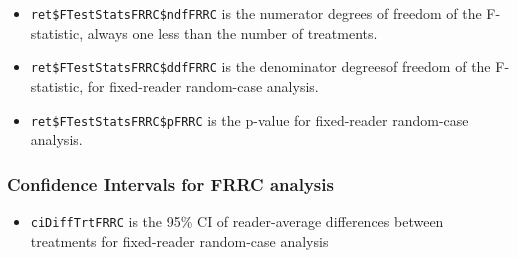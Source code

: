 \documentclass[
]{book}
\newenvironment{Shaded}{\begin{snugshade}}{\end{snugshade}}
\newcommand{\CommentTok}[1]{\textcolor[rgb]{0.56,0.35,0.01}{\textit{#1}}}
\newcommand{\NormalTok}[1]{#1}
\newcommand{\OperatorTok}[1]{\textcolor[rgb]{0.81,0.36,0.00}{\textbf{#1}}}
\providecommand{\tightlist}{%
  \setlength{\itemsep}{0pt}\setlength{\parskip}{0pt}}
\begin{document}
\begin{itemize}
\tightlist
\item
  \texttt{ret\$FTestStatsFRRC\$ndfFRRC} is the numerator degrees of freedom of the F-statistic, always one less than the number of treatments.
\end{itemize}

\begin{Shaded}
\end{Shaded}

\begin{itemize}
\tightlist
\item
  \texttt{ret\$FTestStatsFRRC\$ddfFRRC} is the denominator degreesof freedom of the F-statistic, for fixed-reader random-case analysis.
\end{itemize}

\begin{Shaded}
\end{Shaded}

\begin{itemize}
\tightlist
\item
  \texttt{ret\$FTestStatsFRRC\$pFRRC} is the p-value for fixed-reader random-case analysis.
\end{itemize}

\begin{Shaded}
\end{Shaded}

\hypertarget{confidence-intervals-for-frrc-analysis}{%
\subsubsection{Confidence Intervals for FRRC analysis}\label{confidence-intervals-for-frrc-analysis}}

\begin{itemize}
\tightlist
\item
  \texttt{ciDiffTrtFRRC} is the 95\% CI of reader-average differences between treatments for fixed-reader random-case analysis
\end{itemize}
\end{document}
